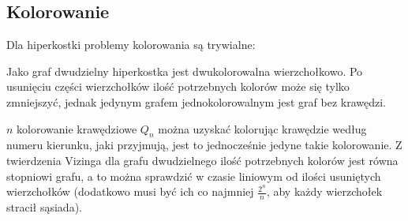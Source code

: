 \documentclass{pracamgr}
\begin{document}
   \subsection{Kolorowanie}
    Dla hiperkostki problemy kolorowania są trywialne:
    
    Jako graf dwudzielny hiperkostka jest dwukolorowalna wierzchołkowo. Po usunięciu części wierzchołków ilość potrzebnych kolorów może się tylko zmniejszyć,
    jednak jedynym grafem jednokolorowalnym jest graf bez krawędzi.
 
    $n$ kolorowanie krawędziowe $Q_n$ można uzyskać kolorując krawędzie według numeru kierunku, jaki przyjmują, jest to jednocześnie jedyne takie kolorowanie.
    Z twierdzenia Vizinga dla grafu dwudzielnego ilość potrzebnych kolorów jest równa stopniowi grafu, a to można sprawdzić w czasie liniowym od ilości
    usuniętych wierzchołków (dodatkowo musi być ich co najmniej $\frac{2^n}{n}$, aby każdy wierzchołek stracił sąsiada).
\end{document}
